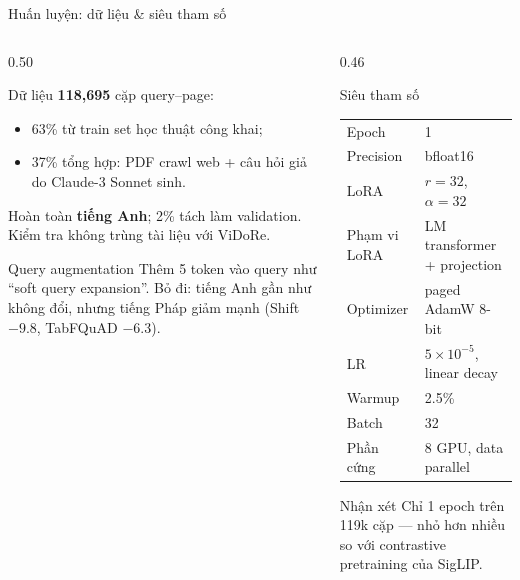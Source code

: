 \documentclass[aspectratio=169,10pt]{beamer}
\newcommand{\code}[1]{\texttt{\footnotesize #1}}
\begin{document}
\begin{frame}{Huấn luyện: dữ liệu \& siêu tham số}
  \begin{columns}[T]
    \begin{column}{0.50\textwidth}
      \begin{block}{\small Dữ liệu}
        \footnotesize
        \textbf{118,695} cặp query--page:
        \begin{itemize}
          \item 63\% từ train set học thuật công khai;
          \item 37\% tổng hợp: PDF crawl web + câu hỏi giả do Claude-3 Sonnet sinh.
        \end{itemize}
        Hoàn toàn \textbf{tiếng Anh}; 2\% tách làm validation.\\
        Kiểm tra không trùng tài liệu với ViDoRe.
      \end{block}
      \begin{block}{\small Query augmentation}
        \footnotesize
        Thêm 5 token \code{<unused0>} vào query như ``soft query expansion''.
        Bỏ đi: tiếng Anh gần như không đổi, nhưng tiếng Pháp giảm mạnh (Shift $-9.8$, TabFQuAD $-6.3$).
      \end{block}
    \end{column}
    \begin{column}{0.46\textwidth}
      \begin{block}{\small Siêu tham số}
        \footnotesize
        \begin{tabular}{@{}ll@{}}
          Epoch & 1 \\
          Precision & bfloat16 \\
          LoRA & $r=32$, $\alpha=32$ \\
          Phạm vi LoRA & LM transformer + projection \\
          Optimizer & paged AdamW 8-bit \\
          LR & $5\times10^{-5}$, linear decay \\
          Warmup & 2.5\% \\
          Batch & 32 \\
          Phần cứng & 8 GPU, data parallel \\
        \end{tabular}
      \end{block}
      \begin{block}{\small Nhận xét}
        \footnotesize
        Chỉ 1 epoch trên 119k cặp --- nhỏ hơn nhiều so với contrastive pretraining của SigLIP.
      \end{block}
    \end{column}
  \end{columns}
\end{frame}
\end{document}
